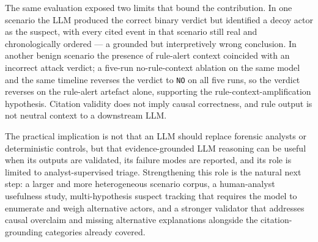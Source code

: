 \documentclass[conference]{IEEEtran}
\begin{document}
The same evaluation exposed two limits that bound the contribution. In one scenario the LLM produced the correct binary verdict but identified a decoy actor as the suspect, with every cited event in that scenario still real and chronologically ordered --- a grounded but interpretively wrong conclusion. In another benign scenario the presence of rule-alert context coincided with an incorrect attack verdict; a five-run no-rule-context ablation on the same model and the same timeline reverses the verdict to \texttt{NO} on all five runs, so the verdict reverses on the rule-alert artefact alone, supporting the rule-context-amplification hypothesis. Citation validity does not imply causal correctness, and rule output is not neutral context to a downstream LLM.

The practical implication is not that an LLM should replace forensic analysts or deterministic controls, but that evidence-grounded LLM reasoning can be useful when its outputs are validated, its failure modes are reported, and its role is limited to analyst-supervised triage. Strengthening this role is the natural next step: a larger and more heterogeneous scenario corpus, a human-analyst usefulness study, multi-hypothesis suspect tracking that requires the model to enumerate and weigh alternative actors, and a stronger validator that addresses causal overclaim and missing alternative explanations alongside the citation-grounding categories already covered.
\end{document}
